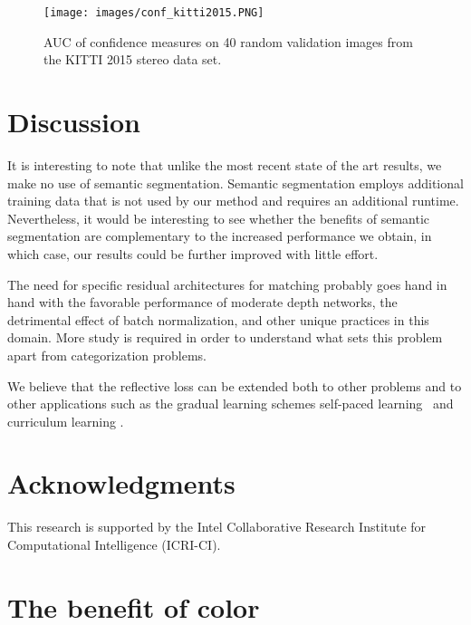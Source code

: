 \documentclass[10pt, twocolumn, letterpaper]{article}
\begin{document}
\begin{figure}[t]
\centering
  \texttt{[image: images/conf\_kitti2015.PNG]}%
\caption{AUC of confidence measures on 40 random validation images from the KITTI 2015 stereo data set.}
\label{fig:kitti2015_conf}
\end{figure}

\section{Discussion}

It is interesting to note that unlike the most recent state of the art results, we make no use of semantic segmentation. Semantic segmentation employs additional training data that is not used by our method and requires an additional runtime. Nevertheless, it would be interesting to see whether the benefits of semantic segmentation are complementary to the increased performance we obtain, in which case, our results could be further improved with little effort.

The need for specific residual architectures for matching probably goes hand in hand with the favorable performance of moderate depth networks, the detrimental effect of batch normalization, and other unique practices in this domain. More study is required in order to understand what sets this problem apart from categorization problems.

We believe that the reflective loss can be extended both to other problems and to other applications such as the gradual learning schemes self-paced learning~\cite{kumar2010self} and curriculum learning \cite{bengio2009curriculum}. 

\section*{Acknowledgments}
This research is supported by the Intel Collaborative Research Institute for Computational Intelligence (ICRI-CI).


{\small


}

\appendix
\section{The benefit of color}
\label{ap:color}
\end{document}
